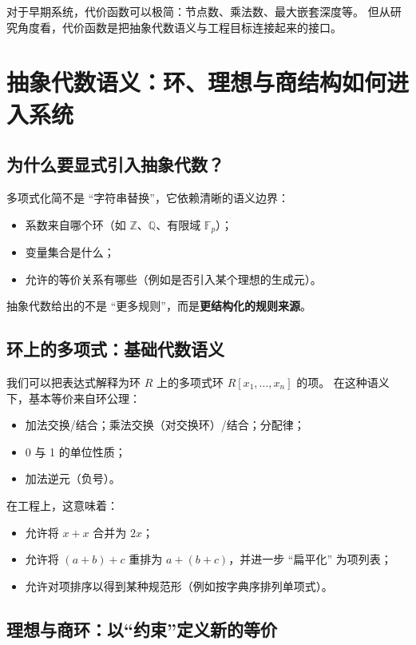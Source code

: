 \documentclass[12pt,openany]{book}
\begin{document}
对于早期系统，代价函数可以极简：节点数、乘法数、最大嵌套深度等。
但从研究角度看，代价函数是把抽象代数语义与工程目标连接起来的接口。

\chapter{抽象代数语义：环、理想与商结构如何进入系统}

\section{为什么要显式引入抽象代数？}

多项式化简不是 ``字符串替换''，它依赖清晰的语义边界：

\begin{itemize}
  \item 系数来自哪个环（如 $\mathbb{Z}$、$\mathbb{Q}$、有限域 $\mathbb{F}_p$）；
  \item 变量集合是什么；
  \item 允许的等价关系有哪些（例如是否引入某个理想的生成元）。
\end{itemize}

抽象代数给出的不是 ``更多规则''，而是\textbf{更结构化的规则来源}。

\section{环上的多项式：基础代数语义}

我们可以把表达式解释为环 $R$ 上的多项式环 $R[x_1,\dots,x_n]$ 的项。
在这种语义下，基本等价来自环公理：

\begin{itemize}
  \item 加法交换/结合；乘法交换（对交换环）/结合；分配律；
  \item 0 与 1 的单位性质；
  \item 加法逆元（负号）。
\end{itemize}

在工程上，这意味着：

\begin{itemize}
  \item 允许将 $x + x$ 合并为 $2x$；
  \item 允许将 $(a+b)+c$ 重排为 $a+(b+c)$，并进一步 ``扁平化'' 为项列表；
  \item 允许对项排序以得到某种规范形（例如按字典序排列单项式）。
\end{itemize}

\section{理想与商环：以“约束”定义新的等价}
\end{document}
